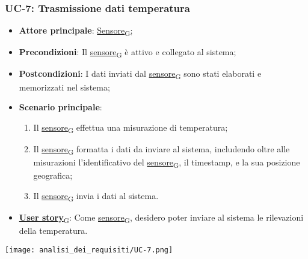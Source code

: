 \subsubsection{UC-7: Trasmissione dati temperatura}
\begin{itemize}
	\item \textbf{Attore principale}: \href{https://7last.github.io/docs/rtb/documentazione-interna/glossario\#sensore}{Sensore\textsubscript{G}};
	\item \textbf{Precondizioni}: Il \href{https://7last.github.io/docs/rtb/documentazione-interna/glossario\#sensore}{sensore\textsubscript{G}} è attivo e collegato al sistema;
	\item \textbf{Postcondizioni}: I dati inviati dal \href{https://7last.github.io/docs/rtb/documentazione-interna/glossario\#sensore}{sensore\textsubscript{G}} sono stati elaborati e memorizzati nel sistema;
	\item \textbf{Scenario principale}:
	      \begin{enumerate}
		      \item Il \href{https://7last.github.io/docs/rtb/documentazione-interna/glossario\#sensore}{sensore\textsubscript{G}} effettua una misurazione di temperatura;
		      \item Il \href{https://7last.github.io/docs/rtb/documentazione-interna/glossario\#sensore}{sensore\textsubscript{G}} formatta i dati da inviare al sistema, includendo oltre alle misurazioni l'identificativo del \href{https://7last.github.io/docs/rtb/documentazione-interna/glossario\#sensore}{sensore\textsubscript{G}},
		            il timestamp, e la sua posizione geografica;
		      \item Il \href{https://7last.github.io/docs/rtb/documentazione-interna/glossario\#sensore}{sensore\textsubscript{G}} invia i dati al sistema.
	      \end{enumerate}
	\item \href{https://7last.github.io/docs/rtb/documentazione-interna/glossario\#user-story}{\textbf{User story}\textsubscript{G}}: Come \href{https://7last.github.io/docs/rtb/documentazione-interna/glossario\#sensore}{sensore\textsubscript{G}}, desidero poter inviare al sistema le rilevazioni della temperatura.
\end{itemize}

\begin{center}
	\texttt{[image: analisi\_dei\_requisiti/UC-7.png]}
\end{center}

